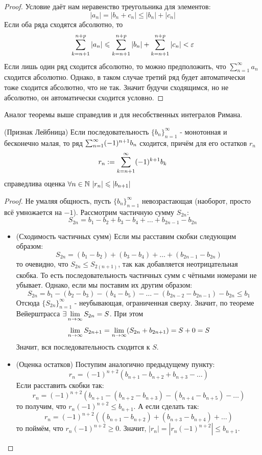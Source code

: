 \begin{proof}
	Условие даёт нам неравенство треугольника для элементов:
	\[
		|a_n| = |b_n + c_n| \le |b_n| + |c_n|
	\]
	Если оба ряда сходятся абсолютно, то
	\[
		\sum\limits_{k = n + 1}^{n + p} |a_n| \leqslant \sum\limits_{k = n + 1}^{n + p} |b_n| + \sum\limits_{k = n + 1}^{n + p} |c_n| < \varepsilon
	\]
	Если лишь один ряд сходится абсолютно, то можно предположить, что $\sum_{n = 1}^{\infty} a_n$ сходится абсолютно. Однако, в таком случае третий ряд будет автоматически тоже сходится абсолютно, что не так. Значит будучи сходящимся, но не абсолютно, он автоматически сходится условно.
\end{proof}

\begin{note}
	Аналог теоремы выше справедлив и для несобственных интегралов Римана.
\end{note}

\begin{theorem} (Признак Лейбница)
	Если последовательность $\{b_n\}_{n = 1}^\infty$ - монотонная и бесконечно малая, то ряд $\sum_{n = 1}^\infty (-1)^{n + 1} b_n$ сходится, причём для его остатков $r_n$
	\[
		r_n := \sum\limits_{k = n + 1}^\infty (-1)^{k + 1} b_k
	\]
	справедлива оценка $\forall n \in \mathbb{N}\ |r_n| \leqslant |b_{n + 1}|$
\end{theorem}

\begin{proof} Не умаляя общность, пусть $\{b_n\}_{n = 1}^\infty$ невозрастающая (наоборот, просто всё умножается на $-1$). 
	Рассмотрим частичную сумму $S_{2n}$:
	\[
		S_{2n} = b_1 - b_2 + b_3 - b_4 + \ldots + b_{2n - 1} - b_{2n}
	\]
	\begin{itemize}
		\item (Сходимость частичных сумм) Если мы расставим скобки следующим образом:
		\[
			S_{2n} = (b_1 - b_2) + (b_3 - b_4) + \ldots + (b_{2n - 1} - b_{2n})
		\]
		то очевидно, что $S_{2n} \le S_{2(n + 1)}$, так как добавляется неотрицательная скобка. То есть последовательность частичных сумм с чётными номерами не убывает. Однако, если мы поставим их другим образом:
		\[
			S_{2n} = b_1 - (b_2 - b_3) - (b_4 - b_5) - \ldots - (b_{2n - 2} - b_{2n - 1}) - b_{2n} \le b_1
		\]
		Отсюда $\{S_{2n}\}_{n = 1}^\infty$ - неубывающая, ограниченная сверху. Значит, по теореме Вейерштрасса $\exists \lim\limits_{n \to \infty} S_{2n} = S$. При этом
		\[
			\lim\limits_{n \to \infty} S_{2n + 1} = \lim\limits_{n \to \infty} (S_{2n} + b_{2n + 1}) = S + 0 = S
		\]
		Значит, вся последовательность сходится к $S$.
		
		\item (Оценка остатков) Поступим аналогично предыдущему пункту:
		\[
			r_n = (-1)^{n+2}(b_{n+1} - b_{n+2} + b_{n+3} - \ldots)
		\]
		Если расставить скобки так:
		\[
		r_n = (-1)^{n+2}(b_{n+1} - (b_{n+2} - b_{n+3}) -(b_{n+4}-b_{n+5})- \ldots)
		\]
		то получим, что $r_n (-1)^{n+2} \le b_{n+1}$. А если сделать так:
		\[
		r_n = (-1)^{n+2}((b_{n+1} - b_{n+2}) + (b_{n+3} - b_{n+4})+ \ldots)
		\]
		то поймём, что $r_n(-1)^{n+2} \ge 0$. Значит, $|r_n|=|r_n(-1)^{n+2}| \le b_{n+1}$. 
	\end{itemize}
\end{proof}

